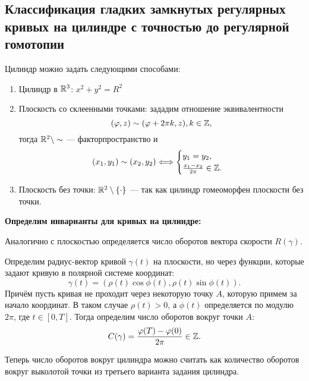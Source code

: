 \subsection{Классификация гладких замкнутых регулярных кривых на цилиндре с точностью до регулярной гомотопии}
Цилиндр можно задать следующими способами:
\begin{enumerate}
    \item Цилиндр в $\mathbb{R}^3$: $x^2+y^2=R^2$
    \item Плоскость со склеенными точками: зададим отношение эквивалентности 
    \[(\varphi, z) \sim (\varphi + 2\pi k, z), k \in \mathbb{Z},\] тогда $\mathbb{R}^2 \setminus \sim$ — факторпространство и 
    \[(x_1, y_1) \sim (x_2, y_2) \Longleftrightarrow \begin{cases}
        y_1 = y_2,\\
        \frac{x_1-x_2}{2\pi} \in \mathbb{Z}.
    \end{cases}
    \]
    \item Плоскость без точки: $\mathbb{R}^2 \setminus \{\cdot\}$ — так как цилиндр гомеоморфен плоскости без точки.
\end{enumerate}

\textbf{Определим инварианты для кривых на цилиндре:}

Аналогично с плоскостью определяется число оборотов вектора скорости $R(\gamma)$.

Определим радиус-вектор кривой $\gamma(t)$ на плоскости, но через функции, которые задают кривую в полярной системе координат:
\[\gamma(t) = (\rho(t) \cos{\phi(t)}, \rho(t) \sin{\phi(t)}).\]
Причём пусть кривая не проходит через некоторую точку $A$, которую примем за начало координат. В таком случае $\rho(t) > 0$, а $\phi(t)$ определяется по модулю $2\pi$, где $t \in [0,T]$.
Тогда определим число оборотов вокруг точки $A$:
\[C(\gamma) = \frac{\varphi(T) - \varphi(0)}{2\pi} \in \mathbb{Z}.\]

Теперь число оборотов вокруг цилиндра можно считать как количество оборотов вокруг выколотой точки из третьего варианта задания цилиндра.

